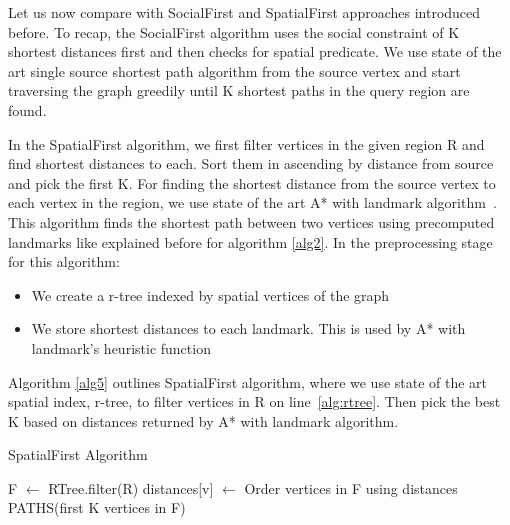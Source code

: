 Let us now compare {\rrp} with SocialFirst and SpatialFirst approaches introduced before. To recap, the SocialFirst algorithm uses the social constraint of K shortest distances first and then checks for spatial predicate. We use state of the art single source shortest path algorithm from the source vertex and start traversing the graph greedily until K shortest paths in the query region are found. 

In the SpatialFirst algorithm, we first filter vertices in the given region R and find shortest distances to each. Sort them in ascending by distance from source and pick the first K. For finding the shortest distance from the source vertex to each vertex in the region, we use state of the art A* with landmark algorithm~\cite{AC2005}. This algorithm finds the shortest path between two vertices using precomputed landmarks like explained before for algorithm \ref{alg2}. In the preprocessing stage for this algorithm:
\begin{itemize}
	\item We create a r-tree indexed by spatial vertices of the graph
	\item We store shortest distances to each landmark. This is used by A* with landmark's heuristic function
\end{itemize}

Algorithm \ref{alg5} outlines SpatialFirst algorithm, where we use state of the art spatial index, r-tree, to filter vertices in R on line~\ref{alg:rtree}. Then pick the best K based on distances returned by A* with landmark algorithm.

\begin{algorithm}[t]
\caption{SpatialFirst Algorithm}
\begin{scriptsize}
\label{alg5}
\begin{algorithmic}[1]
  \State F $\gets$ RTree.filter(R) \label{alg:rtree}
	  \State distances[v] $\gets$ 
  \EndFor
  \State Order vertices in F using distances
  \State \Return PATHS(first K vertices in F)
\EndFunction
\end{algorithmic}
\end{scriptsize}
\end{algorithm}

